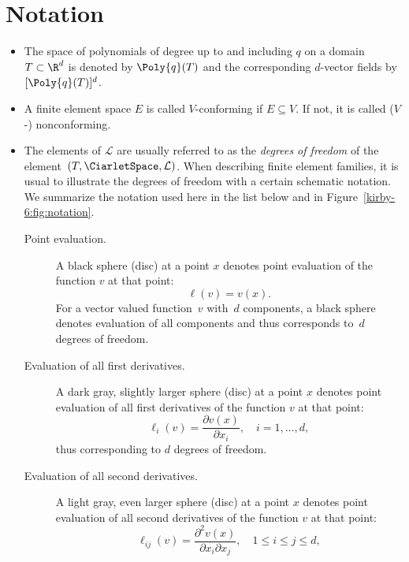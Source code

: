 \section{Notation}

\begin{itemize}
\item
  The space of polynomials of degree up to and including $q$ on a
  domain $T \subset \R^d$ is denoted by $\Poly{q}(T)$ and the
  corresponding $d$-vector fields by $[\Poly{q}(T)]^d$.
\item
  A finite element space $E$ is called $V$-conforming if $E \subseteq
  V$. If not, it is called ($V$-) nonconforming.
\item The elements of $\mathcal{L}$ are usually referred to as the
  \emph{degrees of freedom} of the element~$(T, \CiarletSpace,
  \mathcal{L})$. When describing finite element families, it is usual
  to illustrate the degrees of freedom with a certain schematic
  notation. We summarize the notation used here in the list below and
  in Figure~\ref{kirby-6:fig:notation}.
  \begin{description}
  \item[Point evaluation.]
    A black sphere (disc) at a point $x$ denotes point
    evaluation of the function $v$ at that point:
    \begin{equation}
      \ell(v) = v(x).
    \end{equation}
    For a vector valued function~$v$ with~$d$ components, a black
    sphere denotes evaluation of all components and thus corresponds
    to~$d$ degrees of freedom.
  \item[Evaluation of all first derivatives.]
    A dark gray, slightly larger sphere (disc) at a point $x$ denotes point
    evaluation of all first derivatives of the function $v$ at that point:
    \begin{equation}
      \ell_i(v) = \frac{\partial v(x)}{\partial x_i}, \quad i
      =1, \ldots, d,
    \end{equation}
    thus corresponding to $d$ degrees of freedom.
  \item[Evaluation of all second derivatives.]
    A light gray, even larger sphere (disc) at a point $x$ denotes point
    evaluation of all second derivatives of the function $v$ at that point:
    \begin{equation}
      \ell_{ij}(v) = \frac{\partial^2 v(x)}{\partial x_i \partial
        x_j}, \quad 1 \leqslant i \leqslant j \leqslant d,

\end{equation}
\end{description}
\end{itemize}
